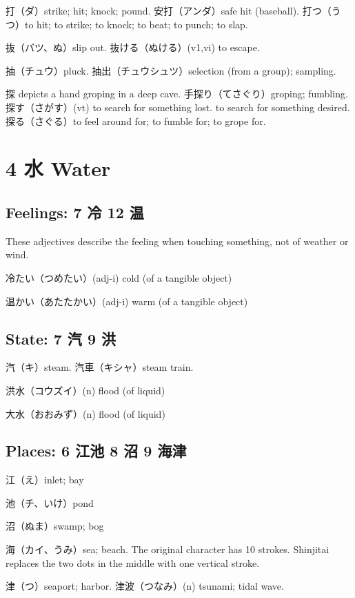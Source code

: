 打（ダ）strike; hit; knock; pound.
安打（アンダ）safe hit (baseball).
打つ（うつ）to hit; to strike; to knock; to beat; to punch; to slap.

抜（バツ、ぬ）slip out.
抜ける（ぬける）(v1,vi) to escape.

抽（チュウ）pluck.
抽出（チュウシュツ）selection (from a group); sampling.

探 depicts a hand groping in a deep cave.
手探り（てさぐり）groping; fumbling.
探す（さがす）(vt)
to search for something lost.
to search for something desired.
探る（さぐる）to feel around for; to fumble for; to grope for.

\section{4 水 Water}

\subsection{Feelings: 7 冷 12 温}

These adjectives describe the feeling when
touching something, not of weather or wind.

冷たい（つめたい）(adj-i) cold (of a tangible object)

温かい（あたたかい）(adj-i) warm (of a tangible object)

\subsection{State: 7 汽 9 洪}

汽（キ）steam.
汽車（キシャ）steam train.

洪水（コウズイ）(n) flood (of liquid)

大水（おおみず）(n) flood (of liquid)

\subsection{Places: 6 江池 8 沼 9 海津}

江（え）inlet; bay

池（チ、いけ）pond

沼（ぬま）swamp; bog

海（カイ、うみ）sea; beach.
The original character has 10 strokes.
Shinjitai replaces the two dots in the middle
with one vertical stroke.

津（つ）seaport; harbor.
津波（つなみ）(n) tsunami; tidal wave.

